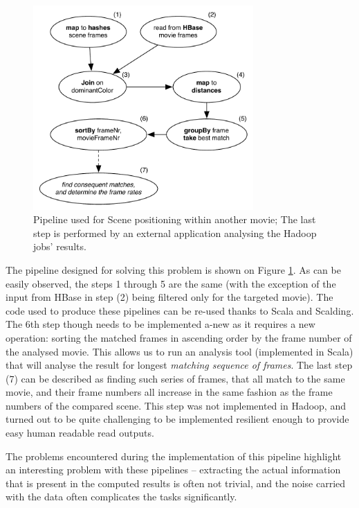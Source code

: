 \begin{figure}[ch!]
  \centering
  \includegraphics[width=0.75\textwidth]{img/top-match-job-positioning}
  \caption{Pipeline used for Scene positioning within another movie; The last step is performed by an external application analysing the Hadoop jobs' results.}
  \label{fig:job-scene}
\end{figure}

The pipeline designed for solving this problem is shown on Figure \ref{fig:job-scene}. As can be easily observed, the steps 1 through 5 are the same (with the exception of the input from HBase in step (2) being filtered only for the targeted movie). The code used to produce these pipelines can be re-used thanks to Scala and Scalding. The 6th step though needs to be implemented a-new as it requires a new operation: sorting the matched frames in ascending order by the frame number of the analysed movie. This allows us to run an analysis tool (implemented in Scala) that will analyse the result for longest \textit{matching sequence of frames}. The last step (7) can be described as finding such series of frames, that all match to the same movie, and their frame numbers all increase in the same fashion as the frame numbers of the compared scene. This step was not implemented in Hadoop, and turned out to be quite challenging to be implemented resilient enough to provide easy human readable read outputs. 


The problems encountered during the implementation of this pipeline highlight an interesting problem with these pipelines -- extracting the actual information that is present in the computed results is often not trivial, and the noise carried with the data often complicates the tasks significantly.






